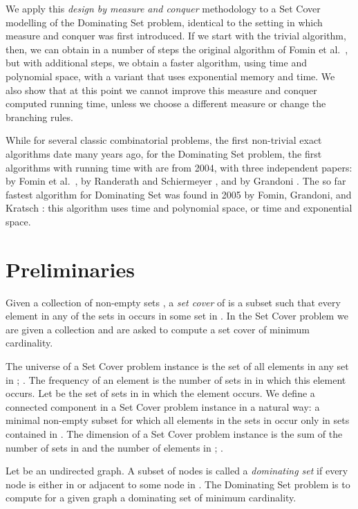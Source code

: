 \documentclass[fleqn]{stacs_proc}
\begin{document}
We apply this {\em design by measure and conquer} methodology to a {\sc Set Cover}
modelling of the {\sc Dominating Set} problem, identical to the setting in which
measure and conquer was first introduced.
If we start with the trivial algorithm, then, we can obtain in a number of steps the original
algorithm of Fomin et al.~\cite{FominGK05a}, but with additional steps, we obtain a faster
algorithm, using  time and polynomial space, with a variant that uses exponential
memory and  time. We also show that at this point we cannot improve this
measure and conquer computed running time, unless we choose a different measure
or change the branching rules.

While for several classic combinatorial problems, the first non-trivial exact algorithms date many years
ago, for the {\sc Dominating Set} problem, the first algorithms with running time 
 with  are from 2004, with three independent papers: by Fomin et
al.~\cite{FominKW04}, by Randerath and Schiermeyer \cite{RanderathS05}, and by
Grandoni \cite{Grandoni06}. The so far fastest algorithm for {\sc Dominating Set} was
found in 2005 by Fomin, Grandoni, and Kratsch \cite{FominGK05a}: this algorithm uses 
 time and polynomial space, or  time and exponential space.






\section{Preliminaries} \label{sec:definitions}
Given a collection of non-empty sets ,
a \emph{set cover} of  is a subset
 such that every element in any of the sets in  occurs in some set in .
In the {\sc Set Cover} problem we are given a collection 
and are asked to compute a set cover of minimum cardinality.

The universe  of a {\sc Set Cover}
problem instance is the set of all elements in any set in ; .
The frequency  of an element  is the number of sets in  in which this element occurs.
Let  be the set of sets in  in which the element  occurs.
We define a connected component  in a {\sc Set Cover} problem instance  in a natural way:
a minimal non-empty subset  for which all elements in the sets in 
occur only in sets contained in .
The dimension  of a {\sc Set Cover} problem instance is the sum
of the number of sets in  and the number of elements in ; .

Let  be an undirected graph.
A subset  of nodes is called a \emph{dominating set}
if every node  is either in  or adjacent to some node in .
The {\sc Dominating Set} problem is to compute for a given graph 
a dominating set of minimum cardinality.
\end{document}
